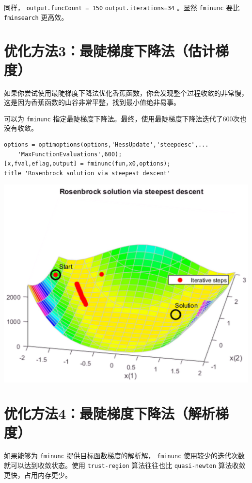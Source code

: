 \documentclass[10pt,a4paper,UTF8]{article}
\begin{document}
同样， \texttt{output.funcCount = 150} \texttt{output.iterations=34} 。显然 \texttt{fminunc} 要比 \texttt{fminsearch} 更高效。

\section{优化方法3：最陡梯度下降法（估计梯度）}
\label{sec:orge4e9c7e}


如果你尝试使用最陡梯度下降法优化香蕉函数，你会发现整个过程收敛的非常慢，这是因为香蕉函数的山谷非常平整，找到最小值绝非易事。

可以为 \texttt{fminunc} 指定最陡梯度下降法。最终，使用最陡梯度下降法迭代了600次也没有收敛。
\lstset{language=matlab,label= ,caption= ,captionpos=b,numbers=none}
\begin{lstlisting}
options = optimoptions(options,'HessUpdate','steepdesc',...
    'MaxFunctionEvaluations',600);
[x,fval,eflag,output] = fminunc(fun,x0,options);
title 'Rosenbrock solution via steepest descent'
\end{lstlisting}

\begin{center}
\includegraphics[width=.9\linewidth]{../../img/communication_matlab/20171014rosenbrockfminunc2.png}
\end{center}

\section{优化方法4：最陡梯度下降法（解析梯度）}
\label{sec:org019faec}


如果能够为 \texttt{fminunc} 提供目标函数梯度的解析解， \texttt{fminunc} 使用较少的迭代次数就可以达到收敛状态。使用 \texttt{trust-region} 算法往往也比 \texttt{quasi-newton} 算法收敛更快，占用内存更少。
\end{document}
